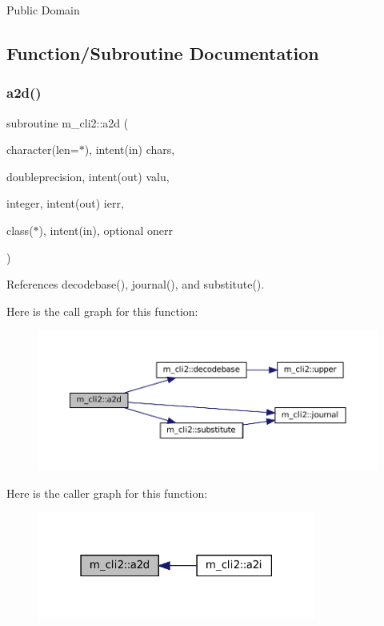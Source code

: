 Public Domain 

\subsection{Function/\+Subroutine Documentation}
\mbox{\label{namespacem__cli2_ad9e1de0ea9d2b4ed758b2a76bf143bd2}} 
\subsubsection{\texorpdfstring{a2d()}{a2d()}}
{\footnotesize\ttfamily subroutine m\+\_\+cli2\+::a2d (\begin{DoxyParamCaption}\item[{character(len=$\ast$), intent(in)}]{chars,  }\item[{doubleprecision, intent(out)}]{valu,  }\item[{integer, intent(out)}]{ierr,  }\item[{class($\ast$), intent(in), optional}]{onerr }\end{DoxyParamCaption})\hspace{0.3cm}{\ttfamily [private]}}



References decodebase(), journal(), and substitute().

Here is the call graph for this function\+:\nopagebreak
\begin{figure}[H]
\begin{center}
\leavevmode
\includegraphics[width=350pt]{namespacem__cli2_ad9e1de0ea9d2b4ed758b2a76bf143bd2_cgraph}
\end{center}
\end{figure}
Here is the caller graph for this function\+:\nopagebreak
\begin{figure}[H]
\begin{center}
\leavevmode
\includegraphics[width=259pt]{namespacem__cli2_ad9e1de0ea9d2b4ed758b2a76bf143bd2_icgraph}
\end{center}
\end{figure}
\mbox{\label{namespacem__cli2_a0be58233adafc0bf10dfe69300a05b9f}} 

